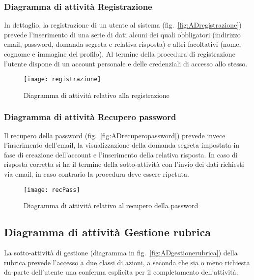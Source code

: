 \subsubsection{Diagramma di attività Registrazione}
In dettaglio, la registrazione di un utente al sistema (fig.~\vref{fig:ADregistrazione}) prevede l'inserimento di una serie di dati alcuni dei quali obbligatori (indirizzo email, password, domanda segreta e relativa risposta) e altri facoltativi (nome, cognome e immagine del profilo). Al termine della procedura di registrazione l'utente dispone di un account personale e delle credenziali di accesso allo stesso.

\begin{figure}[H]
  \centering
  \texttt{[image: registrazione]}
  \caption{Diagramma di attività relativo alla registrazione}\label{fig:ADregistrazione}
\end{figure}

\subsubsection{Diagramma di attività Recupero password}
Il recupero della password (fig.~\vref{fig:ADrecuperopassword}) prevede invece l'inserimento dell'email, la visualizzazione della domanda segreta impostata in fase di creazione dell'account e l'inserimento della relativa risposta. In caso di risposta corretta si ha il termine della sotto-attività con l'invio dei dati richiesti via email, in caso contrario la procedura deve essere ripetuta.

\begin{figure}[H]
  \centering
  \texttt{[image: recPass]}
  \caption{Diagramma di attività relativo al recupero della password}\label{fig:ADrecuperopassword}
\end{figure}

\subsection{Diagramma di attività Gestione rubrica}
La sotto-attività di gestione (diagramma in fig.~\vref{fig:ADgestionerubrica}) della rubrica prevede l'accesso a due classi di azioni, a seconda che sia o meno richiesta da parte dell'utente una conferma esplicita per il completamento dell'attività.

